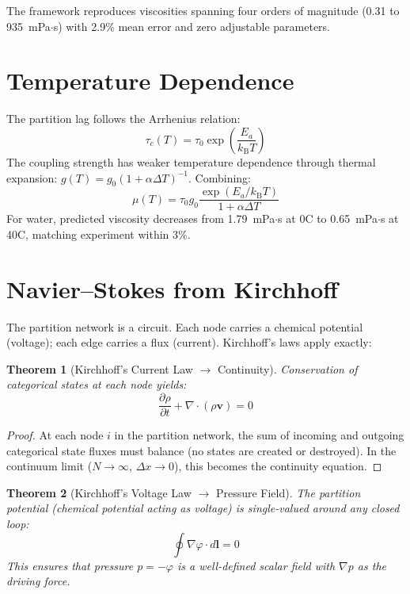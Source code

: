 \documentclass[twocolumn,10pt,a4paper]{article}
\theoremstyle{plain}
\newtheorem{theorem}{Theorem}[section]
\theoremstyle{definition}
\theoremstyle{remark}
\newcommand{\kB}{k_{\mathrm{B}}}
\newcommand{\tauc}{\tau_c}
\begin{document}
The framework reproduces viscosities spanning four orders of magnitude (0.31 to 935~mPa$\cdot$s) with 2.9\% mean error and zero adjustable parameters.

\section{Temperature Dependence}
\label{sec:temp_dep}

The partition lag follows the Arrhenius relation:
\begin{equation}
    \tauc(T) = \tau_0 \exp\!\left(\frac{E_a}{\kB T}\right)
\end{equation}
The coupling strength has weaker temperature dependence through thermal expansion: $g(T) = g_0(1 + \alpha\Delta T)^{-1}$. Combining:
\begin{equation}
    \mu(T) = \tau_0 g_0 \frac{\exp(E_a/\kB T)}{1 + \alpha\Delta T}
\end{equation}
For water, predicted viscosity decreases from 1.79~mPa$\cdot$s at 0\textdegree C to 0.65~mPa$\cdot$s at 40\textdegree C, matching experiment within 3\%.

\section{Navier--Stokes from Kirchhoff}
\label{sec:navier_stokes}

The partition network is a circuit. Each node carries a chemical potential (voltage); each edge carries a flux (current). Kirchhoff's laws apply exactly:

\begin{theorem}[Kirchhoff's Current Law $\to$ Continuity]
\label{thm:kcl}
Conservation of categorical states at each node yields:
\begin{equation}
    \frac{\partial \rho}{\partial t} + \nabla \cdot (\rho \mathbf{v}) = 0
\end{equation}
\end{theorem}

\begin{proof}
At each node $i$ in the partition network, the sum of incoming and outgoing categorical state fluxes must balance (no states are created or destroyed). In the continuum limit ($N \to \infty$, $\Delta x \to 0$), this becomes the continuity equation.
\end{proof}

\begin{theorem}[Kirchhoff's Voltage Law $\to$ Pressure Field]
\label{thm:kvl}
The partition potential (chemical potential acting as voltage) is single-valued around any closed loop:
\begin{equation}
    \oint \nabla \varphi \cdot d\mathbf{l} = 0
\end{equation}
This ensures that pressure $p = -\varphi$ is a well-defined scalar field with $\nabla p$ as the driving force.
\end{theorem}
\end{document}
